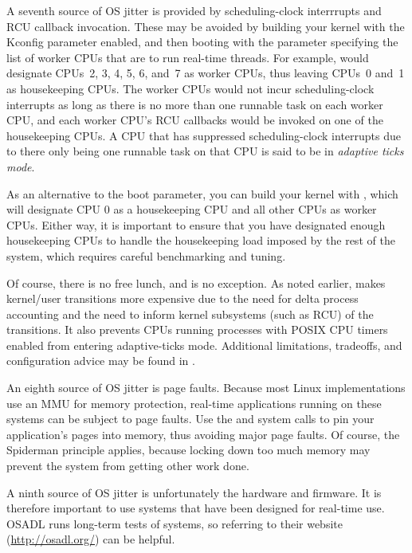 A seventh source of OS jitter is provided by
scheduling-clock interrrupts and RCU callback invocation.
These may be avoided by building your kernel with the
 Kconfig parameter enabled, and then booting
with the  parameter specifying the list of
worker CPUs that are to run real-time threads.
For example,  would designate CPUs~2, 3, 4, 5, 6, and~7
as worker CPUs, thus leaving CPUs~0 and~1 as housekeeping CPUs.
The worker CPUs would not incur scheduling-clock interrupts as long
as there is no more than one runnable task on each worker CPU,
and each worker CPU's RCU callbacks would be invoked on one of the
housekeeping CPUs.
A CPU that has suppressed scheduling-clock interrupts due to there
only being one runnable task on that CPU is said to be in
\emph{adaptive ticks mode}.

As an alternative to the  boot parameter, you can build
your kernel with , which will designate CPU 0 as
a housekeeping CPU and all other CPUs as worker CPUs.
Either way, it is important to ensure that you have designated enough
housekeeping CPUs to handle the housekeeping load imposed by the
rest of the system, which requires careful benchmarking and tuning.

Of course, there is no free lunch, and  is no exception.
As noted earlier,
 makes kernel/user transitions more expensive due to the
need for delta process accounting and the need to inform kernel subsystems
(such as RCU) of the transitions.
It also prevents CPUs running processes with POSIX CPU timers enabled
from entering adaptive-ticks mode.
Additional limitations, tradeoffs, and configuration advice may be
found in .

An eighth source of OS jitter is page faults.
Because most Linux implementations use an MMU for memory protection,
real-time applications running on these systems can be subject
to page faults.
Use the  and  system calls to pin your
application's pages into memory, thus avoiding major page faults.
Of course, the Spiderman principle applies, because locking down
too much memory may prevent the system from getting other work done.

A ninth source of OS jitter is unfortunately the hardware and firmware.
It is therefore important to use systems that have been designed for
real-time use.
OSADL runs long-term tests of systems, so referring to their
website (\url{http://osadl.org/}) can be helpful.

